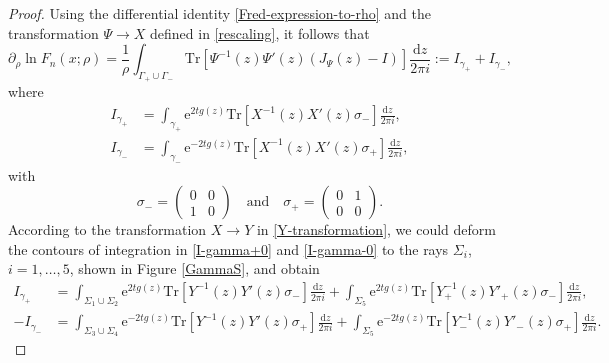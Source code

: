 \documentclass[11pt,a4paper]{article}
\numberwithin{equation}{section}
\begin{document}
\begin{proof}
Using the differential identity \eqref{Fred-expression-to-rho} and the transformation $\Psi\to{X}$ defined in \eqref{rescaling}, it follows that
\begin{equation}\label{eq:dF}
\partial_{\rho}\ln{F_n(x;\rho)}=\frac{1}{\rho}\int_{\Gamma_+\cup\Gamma_-}
\mathrm{Tr}\left[\Psi^{-1}(z)\Psi'(z)(J_{\Psi}(z)-I)\right]\frac{\mathrm{d}z}{2\pi i}:=I_{\gamma_+}+I_{\gamma_-},
\end{equation}
where
\begin{align}\label{I-gamma+0}
I_{\gamma_+}&=\int_{\gamma_+}\mathrm{e}^{2tg(z)}
\mathrm{Tr}\left[X^{-1}(z)X'(z)\sigma_-\right]\frac{\mathrm{d}z}{2\pi i},\\
I_{\gamma_-}&=\int_{\gamma_-}\mathrm{e}^{-2tg(z)}
\mathrm{Tr}\left[X^{-1}(z)X'(z)\sigma_+\right]\frac{\mathrm{d}z}{2\pi i},\label{I-gamma-0}
\end{align}
with
$$
\sigma_-=\begin{pmatrix} 0 & 0 \\ 1 & 0 \end{pmatrix}\quad \mathrm{and} \quad
\sigma_+=\begin{pmatrix} 0 & 1 \\ 0 & 0 \end{pmatrix}.
$$
According to the transformation $X \to Y$ in \eqref{Y-transformation}, we could deform the contours of integration in \eqref{I-gamma+0} and \eqref{I-gamma-0} to the rays $\Sigma_i$, $i=1,\ldots,5$, shown in Figure \ref{GammaS}, and obtain
\begin{align}\label{I-gamma+}
I_{\gamma_+}&=\int_{\Sigma_1\cup\Sigma_2}\mathrm{e}^{2tg(z)}
\mathrm{Tr}\left[Y^{-1}(z)Y'(z)\sigma_-\right]\frac{\mathrm{d}z}{2\pi i}+\int_{\Sigma_5}\mathrm{e}^{2tg(z)}
\mathrm{Tr}\left[Y_+^{-1}(z)Y'_+(z)\sigma_-\right]\frac{\mathrm{d}z}{2\pi i},\\
-I_{\gamma_-}&=\int_{\Sigma_3\cup\Sigma_4}\mathrm{e}^{-2tg(z)}
\mathrm{Tr}\left[Y^{-1}(z)Y'(z)\sigma_+\right]\frac{\mathrm{d}z}{2\pi i}+\int_{\Sigma_5}\mathrm{e}^{-2tg(z)}
\mathrm{Tr}\left[Y_-^{-1}(z)Y'_-(z)\sigma_+\right]\frac{\mathrm{d}z}{2\pi i}.\label{I-gamma-}
\end{align}



\end{proof}
\end{document}
